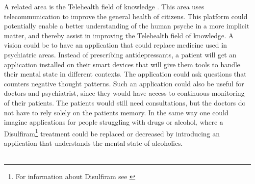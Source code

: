 A related area is the Telehealth field of knowledge \parencite{telehealth_aau}. This area uses telecommunication to improve the general health of citizens. This platform could potentially enable a better understanding of the human psyche in a more implicit matter, and thereby assist in improving the Telehealth field of knowledge. A vision could be to have an application that could replace medicine used in psychiatric areas. Instead of prescribing antidepressants, a patient will get an application installed on their smart devices that will give them tools to handle their mental state in different contexts. The application could ask questions that counters negative thought patterns. Such an application could also be useful for doctors and psychiatrist, since they would have access to continuous monitoring of their patients. The patients would still need consultations, but the doctors do not have to rely solely on the patients memory. In the same way one could imagine applications for people struggling with drugs or alcohol, where a Disulfiram\footnote{For information about Disulfiram see \textcite{nlm_disulfiram}} treatment could be replaced or decreased by introducing an application that understands the mental state of alcoholics.
\\\\
